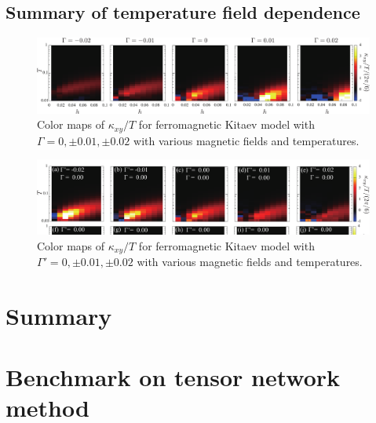 \documentclass[reprint,amsmath,amssymb,aps,prx]{revtex4-2}
\begin{document}
  \subsection{Summary of temperature field dependence}
\begin{figure}
  \begin{center}
    \includegraphics[width=\linewidth]{color_map_G.pdf}
  \end{center}
  \caption{Color maps of $\kappa_{xy}/T$ for ferromagnetic Kitaev model with $\Gamma = 0, \pm 0.01, \pm 0.02$ with various magnetic fields and temperatures.}
  \label{fig:color_map_G}
\end{figure}

\begin{figure}
  \begin{center}
    \includegraphics[width=\linewidth]{color_map_Gp.pdf}
  \end{center}
  \caption{Color maps of $\kappa_{xy}/T$ for ferromagnetic Kitaev model with $\Gamma' = 0, \pm 0.01, \pm 0.02$ with various magnetic fields and temperatures.}
  \label{fig:color_map_Gp}
\end{figure}
 
  
\section{Summary}

\appendix

\section{Benchmark on tensor network method}
\end{document}
